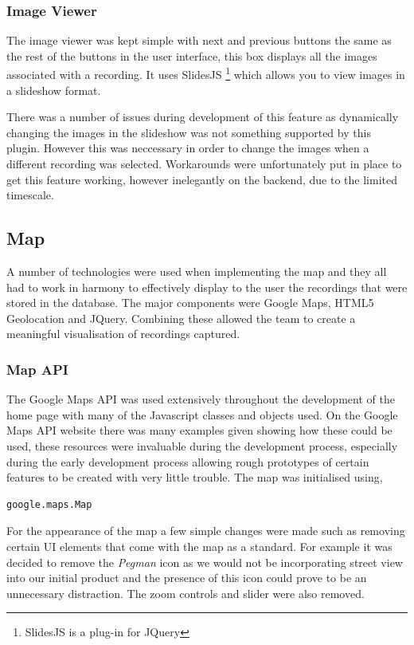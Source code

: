 \documentclass{l3proj}
\begin{document}
\subsubsection{Image Viewer}		The image viewer was kept simple with next and previous buttons the same as the rest of the buttons in the user interface, this box displays all the images associated with a recording. It uses SlidesJS \footnote{SlidesJS is a plug-in for JQuery} which  allows you to view images in a slideshow format.

There was a number of issues during development of this feature as dynamically changing the images in the slideshow was not something supported by this plugin. However this was neccessary in order to change the images when a different recording was selected. Workarounds were unfortunately put in place to get this feature working, however inelegantly on the backend, due to the limited timescale.

\subsection{Map}		A number of technologies were used when implementing the map and they all had to work in harmony to effectively display to the user the recordings that were stored in the database. The major components were Google Maps, HTML5 Geolocation and JQuery. Combining these allowed the team to create a meaningful visualisation of recordings captured.

\subsubsection{Map API}		The Google Maps API was used extensively throughout the development of the home page with many of the Javascript classes and objects used. On the Google Maps API website there was many examples given showing how these could be used, these resources were invaluable during the development process, especially during the early development process allowing rough prototypes of certain features to be created with very little trouble. The map was initialised using,
\begin{verbatim}
google.maps.Map
\end{verbatim}
For the appearance of the map a few simple changes were made such as removing certain UI elements that come with the map as a standard. For example it was decided to remove the \textit{Pegman} icon as we would not be incorporating street view into our initial product and the presence of this icon could prove to be an unnecessary distraction. The zoom controls and slider were also removed.
\end{document}
